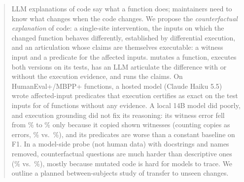 \begin{abstract}
LLM explanations of code say what a function does; maintainers need to know what changes when the code changes. We
propose the \emph{counterfactual explanation} of code: a single-site intervention, the inputs on which the changed
function behaves differently, established by differential execution, and an articulation whose claims are themselves
executable: a witness input and a predicate for the affected inputs. \CoDE mutates a function, executes both versions on
its tests, has an LLM articulate the difference with or without the execution evidence, and runs the claims. On \SNMutants{} HumanEval+/MBPP+ functions, a hosted model (Claude Haiku 5.5) wrote affected-input predicates
that execution certifies as exact on the test inputs for \SPredStrongUExactN{} of \SPredStrongN{} functions without any
evidence. A local 14B model did poorly, and execution
grounding did not fix its reasoning: its witness error fell from \PzWitGenRawA\% to \PzWitGenRawB\% only because it copied
shown witnesses (counting copies as errors, \PWitGenStrictB\% vs.\ \PWitGenStrictA\%), and its predicates are worse than a
constant baseline on F1. In a model-side probe (not human data) with docstrings and names removed, counterfactual questions
are much harder than descriptive ones (\PzProbePonefoursCF\% vs.\ \PzProbePonefoursDESC\%), mostly because mutated code is
hard for models to trace. We outline a planned between-subjects study of transfer to unseen changes.
\end{abstract}
